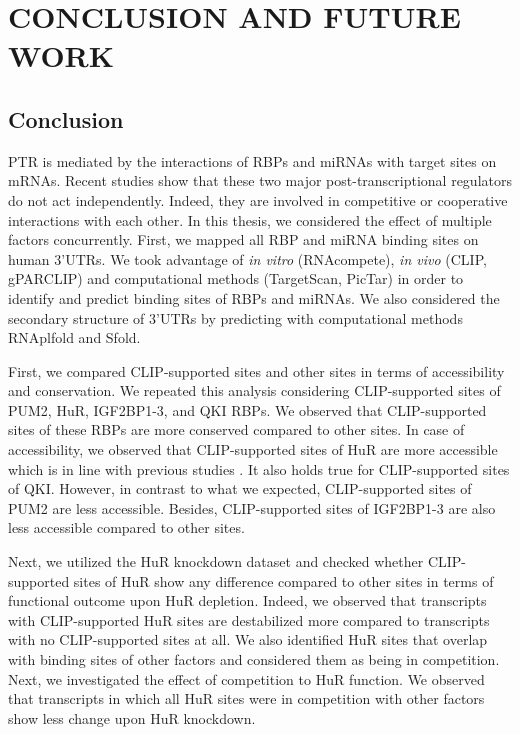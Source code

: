 \chapter{CONCLUSION AND FUTURE WORK}
\label{chp:chapter5}

\section{Conclusion}

PTR is mediated by the interactions of RBPs and miRNAs with target sites on mRNAs. Recent studies show that these two major post-transcriptional regulators do not act independently. Indeed, they are involved in competitive or cooperative interactions with each other. In this thesis, we considered the effect of multiple factors concurrently.  First, we mapped all RBP and miRNA binding sites on human 3’UTRs. We took advantage of \textit{in vitro} (RNAcompete), \textit{in vivo} (CLIP, gPARCLIP) and computational methods (TargetScan, PicTar) in order to identify and predict binding sites of RBPs and miRNAs. We also considered the secondary structure of 3’UTRs by predicting with computational methods RNAplfold and Sfold.   

First, we compared CLIP-supported sites and other sites in terms of accessibility and conservation. We repeated this analysis considering CLIP-supported sites of PUM2, HuR, IGF2BP1-3, and QKI RBPs. We observed that CLIP-supported sites of these RBPs are more conserved compared to other sites. In case of accessibility, we observed that CLIP-supported sites of HuR are more accessible which is in line with previous studies \cite{hur_accessibility, kazan_10}. It also holds true for CLIP-supported sites of QKI. However, in contrast to what we expected, CLIP-supported sites of PUM2 are less accessible. Besides, CLIP-supported sites of IGF2BP1-3 are also less accessible compared to other sites.

Next, we utilized the HuR knockdown dataset and checked whether CLIP-supported sites of HuR show any difference compared to other sites in terms of functional outcome upon HuR depletion. Indeed, we observed that transcripts with CLIP-supported HuR sites are destabilized more compared to transcripts with no CLIP-supported sites at all. We also identified HuR sites that overlap with binding sites of other factors and considered them as being in competition. Next, we investigated the effect of competition to HuR function. We observed that transcripts in which all HuR sites were in competition with other factors show less change upon HuR knockdown. 

